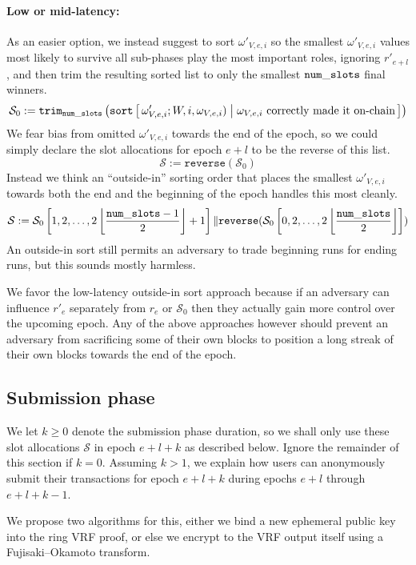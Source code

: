 \paragraph{Low or mid-latency:} 
As an easier option, we instead suggest to sort $\omega'_{V,e,i}$ so the smallest $\omega'_{V,e,i}$ values most likely to survive all sub-phases play the most important roles, ignoring $r'_{e+l}$, and then trim the resulting sorted list to only the smallest $\mathtt{num\_slots}$ final winners. 
$$ 
\mathcal{S}_0 := \mathtt{trim}_\vrfaslotsbound \left( 
\mathtt{sort} \Listst{
  \omega'_{V,e,i}; W,i,\omega_{V,e,i}) 
}{
  \omega_{V,e,i} \text{ correctly made it on-chain} %
} \right) 
$$
We fear bias from omitted $\omega'_{V,e,i}$ towards the end of the epoch, so we could simply declare the slot allocations for epoch $e+l$ to be the reverse of this list.
$$ \mathcal{S} := \mathtt{reverse}( \mathcal{S}_0 )$$
Instead we think an ``outside-in'' sorting order that places the smallest $\omega'_{V,e,i}$ towards both the end and the beginning of the epoch handles this most cleanly.
$$ 
\mathcal{S} := 
  \mathcal{S}_0 \left[ 1,2,\ldots, 2 \left\lfloor {\mathtt{num\_slots}-1 \over 2} \right\rfloor + 1 \right]
\|
  \mathtt{reverse}( \mathcal{S}_0 \left[ 0,2,\ldots, 2 \left\lfloor {\mathtt{num\_slots}\over 2} \right\rfloor \right] )
$$
An outside-in sort still permits an adversary to trade beginning runs for ending runs, but this sounds mostly harmless.

We favor the low-latency outside-in sort approach because if an adversary can influence $r'_e$ separately from $r_e$ or $\mathcal{S}_0$ then they actually gain more control over the upcoming epoch.  Any of the above approaches however should prevent an adversary from sacrificing some of their own blocks to position a long streak of their own blocks towards the end of the epoch.  


\subsection{Submission phase}\label{subsec:submission_phase}

We let $k \ge 0$ denote the submission phase duration, so we shall only use these slot allocations $\mathcal{S}$ in epoch $e+l+k$ as described below.  Ignore the remainder of this section if $k=0$.  Assuming $k>1$, we explain how users can anonymously submit their transactions for epoch $e+l+k$ during epochs $e+l$ through $e+l+k-1$.

We propose two algorithms for this, either we bind a new ephemeral public key into the ring VRF proof, or else we encrypt to the VRF output itself using a Fujisaki–Okamoto transform. 

